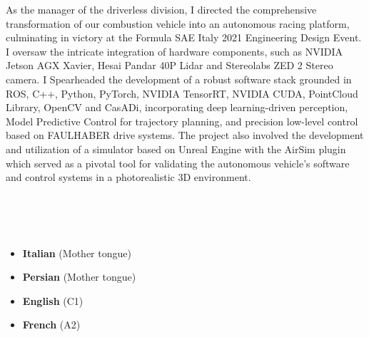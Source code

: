 







As the manager of the driverless division, I directed the comprehensive transformation of our combustion vehicle into an autonomous racing platform, culminating in victory at the Formula SAE Italy 2021 Engineering Design Event. I oversaw the intricate integration of hardware components, such as NVIDIA Jetson AGX Xavier, Hesai Pandar 40P Lidar and Stereolabs ZED 2 Stereo camera. I Spearheaded the development of a robust software stack grounded in ROS, C++, Python, PyTorch, NVIDIA TensorRT, NVIDIA CUDA, PointCloud Library, OpenCV and CasADi, incorporating deep learning-driven perception, Model Predictive Control for trajectory planning, and precision low-level control based on FAULHABER drive systems. The project also involved the development and utilization of a simulator based on Unreal Engine with the AirSim plugin which served as a pivotal tool for validating the autonomous vehicle's software and control systems in a photorealistic 3D environment.

\\
\smallskip
\smallskip
{}\\
\smallskip
\smallskip
{}\\
\smallskip
\smallskip
{}

\begin{itemize}
  \item \textbf{Italian} (Mother tongue)
  \item \textbf{Persian} (Mother tongue)
  \item \textbf{English} (C1)
  \item \textbf{French} (A2)
\end{itemize}